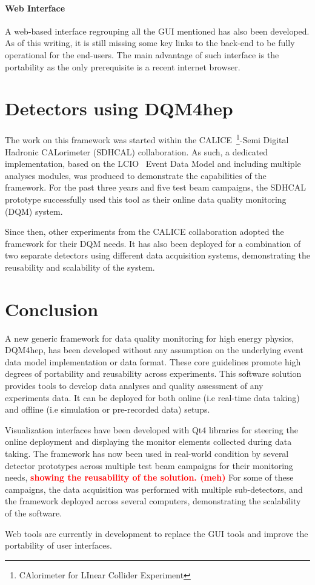 \documentclass{webofc}
\begin{document}
\paragraph{Web Interface}\label{par:WebGUI}
A web-based interface regrouping all the GUI mentioned has also been developed. As of this writing, it is still missing some key links to the back-end to be fully operational for the end-users. The main advantage of such interface is the portability as the only prerequisite is a recent internet browser.

\section{Detectors using DQM4hep}
\label{sec:detectors}

The work on this framework was started within the CALICE~\footnote{CAlorimeter for LInear Collider Experiment}-Semi Digital Hadronic CALorimeter (SDHCAL) collaboration.
As such, a dedicated implementation, based on the LCIO~\cite{LCIO} Event Data Model and including multiple analyses modules, was produced to demonstrate the capabilities of the framework.
For the past three years and five test beam campaigns, the SDHCAL prototype successfully used this tool as their online data quality monitoring (DQM) system.

Since then, other experiments from the CALICE collaboration adopted the framework for their DQM needs. It has also been deployed for a combination of two separate detectors using different data acquisition systems, demonstrating the reusability and scalability of the system.


\section{Conclusion}
\label{sec:conclusion}

A new generic framework for data quality monitoring for high energy physics, DQM4hep, has been developed without any assumption on the underlying event data model implementation or data format.
These core guidelines promote high degrees of portability and reusability across experiments.
This software solution provides tools to develop data analyses and quality assessment of any experiments data.
It can be deployed for both online (i.e real-time data taking) and offline (i.e simulation or pre-recorded data) setups.

Visualization interfaces have been developed with Qt4 libraries for steering the online deployment and displaying the monitor elements collected during data taking.
The framework has now been used in real-world condition by several detector prototypes across multiple test beam campaigns for their monitoring needs, \textcolor{red}{\textbf{showing the reusability of the solution. (meh)}}
For some of these campaigns, the data acquisition was performed with multiple sub-detectors, and the framework deployed across several computers, demonstrating the scalability of the software.

Web tools are currently in development to replace the GUI tools and improve the portability of user interfaces.


\end{document}
